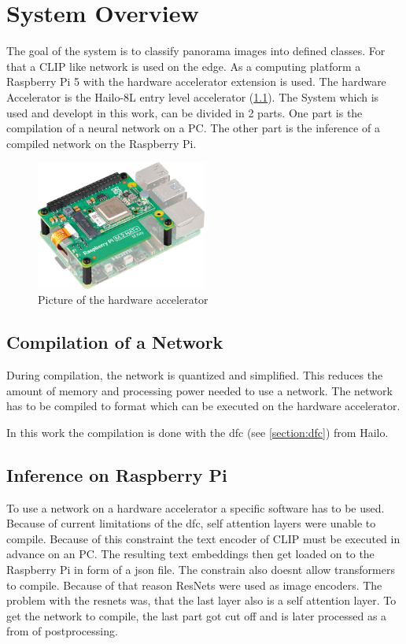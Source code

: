\chapter{System Overview}

The goal of the system is to classify panorama images into defined classes.
For that a CLIP like network is used on the edge.
As a computing platform a Raspberry Pi 5 with the hardware accelerator extension is used.
The hardware Accelerator is the Hailo-8L entry level accelerator (\cref{fig:overview:aikit}).
The System which is used and developt in this work, can be divided in 2 parts.
One part is the compilation of a neural network on a PC.
The other part is the inference of a compiled network on the Raspberry Pi.

\begin{figure}
    \centering
    \includegraphics[width=0.5\textwidth]{Images/SystemOverview/ai-kit.png}
    \caption{Picture of the hardware accelerator \cite{bildAiKit}}
    \label{fig:overview:aikit}
\end{figure}

\section{Compilation of a Network}

During compilation, the network is quantized and simplified.
This reduces the amount of memory and processing power needed to use a network.
The network has to be compiled to format which can be executed on the hardware accelerator.

In this work the compilation is done with the \Acrlong{dfc} (see \cref{section:dfc}) from Hailo.


\section{Inference on Raspberry Pi}

To use a network on a hardware accelerator a specific software has to be used.
Because of current limitations of the \acrshort{dfc}, self attention layers were unable to compile.
Because of this constraint the text encoder of CLIP must be executed in advance on an PC.
The resulting text embeddings then get loaded on to the Raspberry Pi in form of a json file.
The constrain also doesnt allow transformers to compile.
Because of that reason ResNets were used as image encoders.
The problem with the resnets was, that the last layer also is a self attention layer.
To get the network to compile, the last part got cut off and is later processed as a from of postprocessing.

